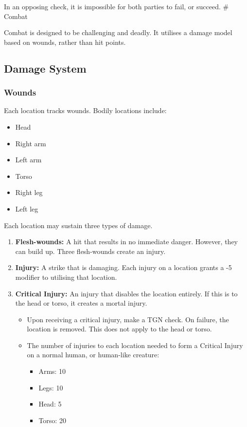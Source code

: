 \documentclass[]{article}
\providecommand{\tightlist}{%
  \setlength{\itemsep}{0pt}\setlength{\parskip}{0pt}}
\begin{document}
In an opposing check, it is impossible for both parties to fail, or
succeed. \# Combat

Combat is designed to be challenging and deadly. It utilises a damage
model based on wounds, rather than hit points.

\subsection{Damage System}\label{damage-system}

\subsubsection{Wounds}\label{wounds}

Each location tracks wounds. Bodily locations include:

\begin{itemize}
\tightlist
\item
  Head
\item
  Right arm
\item
  Left arm
\item
  Torso
\item
  Right leg
\item
  Left leg
\end{itemize}

Each location may sustain three types of damage.

\begin{enumerate}
\def\labelenumi{\arabic{enumi}.}
\tightlist
\item
  \textbf{Flesh-wounds:} A hit that results in no immediate danger.
  However, they can build up. Three flesh-wounds create an injury.
\item
  \textbf{Injury:} A strike that is damaging. Each injury on a location
  grants a -5 modifier to utilising that location.
\item
  \textbf{Critical Injury:} An injury that disables the location
  entirely. If this is to the head or torso, it creates a mortal injury.

  \begin{itemize}
  \tightlist
  \item
    Upon receiving a critical injury, make a TGN check. On failure, the
    location is removed. This does not apply to the head or torso.
  \item
    The number of injuries to each location needed to form a Critical
    Injury on a normal human, or human-like creature:

    \begin{itemize}
    \tightlist
    \item
      Arms: 10
    \item
      Legs: 10
    \item
      Head: 5
    \item
      Torso: 20
    \end{itemize}
  \end{itemize}
\end{enumerate}
\end{document}
